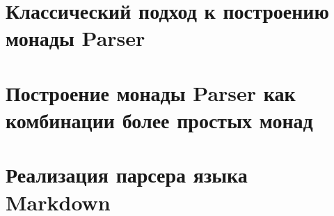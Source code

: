 \chapter{Классический подход к построению монады Parser}

\chapter{Построение монады Parser как комбинации более простых монад}

\chapter{Реализация парсера языка Markdown} 

\printbibliography[heading=bibintoc%
]


